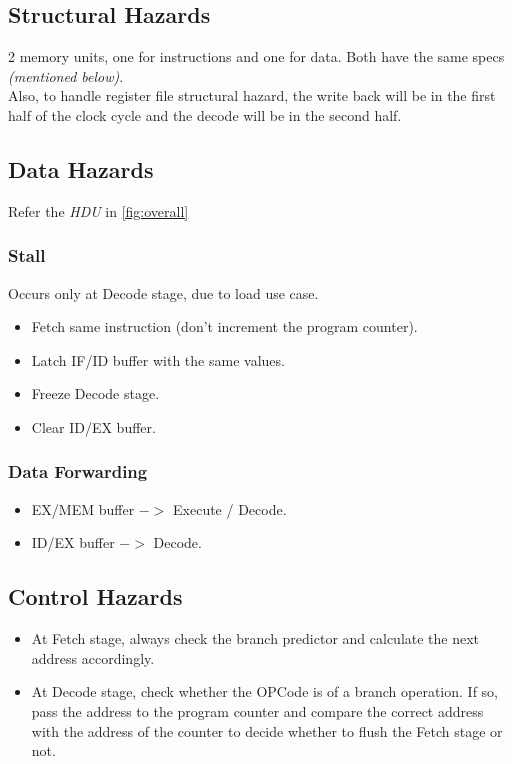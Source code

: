 \documentclass[12pt]{report}
\begin{document}
\subsection{Structural Hazards}
2 memory units, one for instructions and one for data. Both have the same specs \emph{(mentioned below)}. \\
Also, to handle register file structural hazard, the write back will be in the first half of the clock cycle and the decode will be in the second half.

\subsection{Data Hazards}
Refer the \emph{HDU} in \ref{fig:overall}

\subsubsection{Stall}
Occurs only at Decode stage, due to load use case.
\begin{itemize}
    \item Fetch same instruction (don't increment the program counter).
    \item Latch IF/ID buffer with the same values.
    \item Freeze Decode stage.
    \item Clear ID/EX buffer.
\end{itemize}

\subsubsection{Data Forwarding}
\begin{itemize}
    \item EX/MEM buffer $->$ Execute / Decode.
    \item ID/EX buffer $->$ Decode.
\end{itemize}

\subsection{Control Hazards}
\begin{itemize}
    \item At Fetch stage, always check the branch predictor and calculate the next address accordingly.
    \item At Decode stage, check whether the OPCode is of a branch operation. If so, pass the address to the program counter and compare the correct address with the address of the counter to decide whether to flush the Fetch stage or not. 
\end{itemize}
\end{document}
